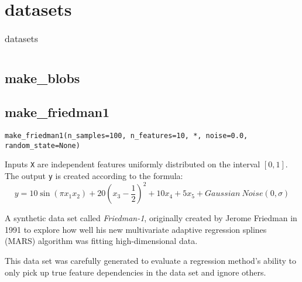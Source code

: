 \chapter{datasets\label{datasets}}
\begin{table}
    \centering
    \caption{datasets}
    \begin{tabular}{lllll}
        \hline
        \nameref{makeblobs} & \nameref{fetch20newsgroups} & \nameref{makefriedman1} & \nameref{makefriedman2} & \nameref{makefriedman3} \\
        \hline
    \end{tabular}
\end{table}
\section{make\_blobs\label{makeblobs}}
\section{make\_friedman1\label{makefriedman1}}
\verb|make_friedman1(n_samples=100, n_features=10, *, noise=0.0, random_state=None)|

Inputs \verb|X| are independent features uniformly distributed on the interval $[0, 1]$. The output \verb|y| is created according to the formula:
\begin{equation}
    y = 10\sin(\pi x_1x_2)+20(x_3-\frac{1}{2})^2+10x_4+5x_5+Gaussian~Noise(0,\sigma)
\end{equation}

A synthetic data set called \textit{Friedman-1}, originally created by Jerome Friedman in 1991 to explore how well his new multivariate adaptive regression splines
(MARS) algorithm was fitting high-dimensional data.

This data set was carefully generated to evaluate a regression method's ability to
only pick up true feature dependencies in the data set and ignore others.


